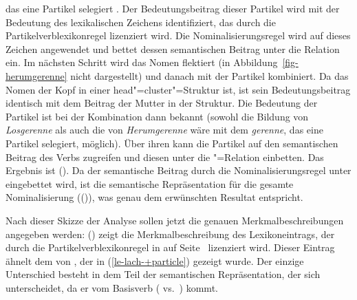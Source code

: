 das eine Partikel selegiert .
Der Bedeutungsbeitrag dieser Partikel  wird mit der Bedeutung
des lexikalischen Zeichens identifiziert, das durch die Partikelverblexikonregel
lizenziert wird. Die Nominalisierungsregel wird auf dieses Zeichen angewendet
und bettet dessen semantischen Beitrag unter die Relation  ein.
Im nächsten Schritt wird das Nomen flektiert (in Abbildung~\ref{fig-herumgerenne} nicht dargestellt)
und danach mit der Partikel kombiniert. Da das Nomen 
der Kopf in einer head"=cluster"=Struktur ist, ist sein Bedeutungsbeitrag  
identisch mit dem Beitrag der Mutter in der Struktur. Die Bedeutung der Partikel
ist bei der Kombination dann bekannt (sowohl die Bildung von \emph{Losgerenne}
als auch die von \emph{Herumgerenne} wäre mit dem \emph{gerenne}, das eine Partikel
selegiert, möglich). Über ihren \modw kann die Partikel auf den semantischen
Beitrag des Verbs zugreifen  und diesen unter die "=Relation
einbetten. Das Ergebnis ist (). 
Da der semantische Beitrag durch die Nominalisierungsregel unter 
eingebettet wird, ist die semantische Repräsentation für die gesamte Nominalisierung
(()), was genau dem
erwünschten Resultat entspricht.

Nach dieser Skizze der Analyse sollen jetzt die genauen Merkmalbeschreibungen angegeben werden:
() zeigt die Merkmalbeschreibung des Lexikoneintrags, der durch die Partikelverblexikonregel
in  auf Seite~\pageref{lr-pv} lizenziert wird. Dieser Eintrag ähnelt dem von , 
der in (\ref{le-lach-+particle}) gezeigt wurde. Der einzige Unterschied besteht
in dem Teil der semantischen Repräsentation, der sich unterscheidet,
da er vom Basisverb ( vs.\ ) kommt.


